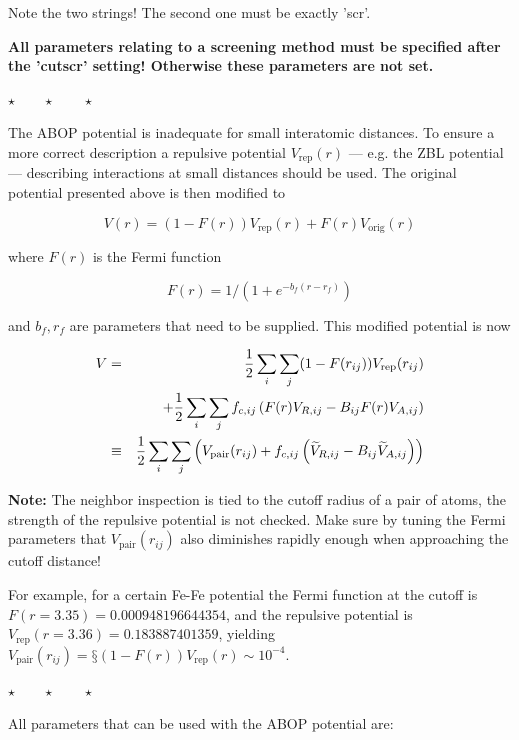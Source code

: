 \documentclass[a4paper,12pt,pdftex,onecolumn]{article}
\newcommand{\stars}{\begin{center}%
\vspace{1em plus 0.5em minus 0.5em}%
$\star \qquad \star \qquad \star$%
\vspace{1em plus 0.5em minus 0.5em}%
\end{center}}
\begin{document}
Note the two strings! The second one must be exactly 'scr'.

\textbf{All parameters relating to a screening method must be specified after the 'cutscr'
setting! Otherwise these parameters are not set.}

\stars

The ABOP potential is inadequate for small interatomic distances.
To ensure a more correct description a repulsive potential
$V_{\mathrm{rep}}(r)$ --- e.g. the ZBL potential --- describing
interactions at small distances should be used.
The original potential presented above is then modified to

\begin{equation}
V(r) = (1-F(r)) V_{\mathrm{rep}}(r) + F(r) V_{\mathrm{orig}}(r)
\end{equation}

where $F(r)$ is the Fermi function

\begin{equation}
F(r) = 1/(1 + e^{-b_f(r-r_f)})
\end{equation}

and $b_f, r_f$ are parameters that need to be supplied.
This modified potential is now

\begin{eqnarray}
V &=& {1 \over 2} \sum_i \sum_{j} (1-F(r_{ij})) V_{\mathrm{rep}}(r_{ij})
\\
& & + {1 \over 2} \sum_i \sum_{j} f_{c,ij} \left( F(r) V_{R,ij} - B_{ij} F(r) V_{A,ij} \right)
\\
&\equiv & 
{1 \over 2} \sum_i \sum_{j} \left(
V_{\mathrm{pair}}(r_{ij})
+ f_{c,ij} \left( \widetilde{V}_{R,ij} - B_{ij} \widetilde{V}_{A,ij} \right) \right)
\label{eq:aboprep}
\end{eqnarray}

\textbf{Note:} The neighbor inspection is tied to the cutoff radius of a pair of
atoms, the strength of the repulsive potential is not checked.
Make sure by tuning the Fermi parameters that 
$V_{\mathrm{pair}}(r_{ij})$ also diminishes rapidly enough when approaching
the cutoff distance!

For example, for a certain Fe-Fe potential the Fermi function at the cutoff is
$F(r=3.35) = 0.000948196644354$, and the repulsive potential is
$V_{\mathrm{rep}}(r=3.36) = 0.183887401359$, yielding
$V_{\mathrm{pair}}(r_{ij}) = §(1-F(r)) V_{\mathrm{rep}}(r) \sim 10^{-4}$.


\stars

All parameters that can be used with the ABOP potential are:
\end{document}
